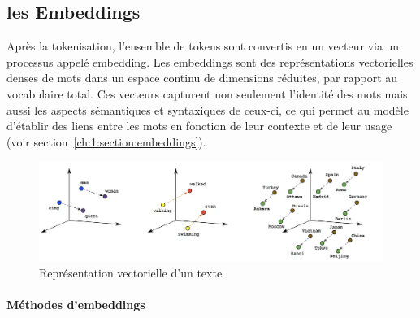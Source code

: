 \subsection{les Embeddings}
\label{ch:2:section:embeddings}

Après la tokenisation, l'ensemble de tokens sont convertis en un vecteur via un processus appelé embedding. Les embeddings sont des représentations vectorielles denses de mots dans un espace continu de dimensions réduites, par rapport au vocabulaire total. Ces vecteurs capturent non seulement l'identité des mots mais aussi les aspects sémantiques et syntaxiques de ceux-ci, ce qui permet au modèle d'établir des liens entre les mots en fonction de leur contexte et de leur usage (voir section~\ref{ch:1:section:embeddings}).

\begin{figure}[H]
    \centering
    \includegraphics[width=15cm]{gfx/fig-embeddings.png}
    \caption{Représentation vectorielle d'un texte \cite{Anala_2020}}
    \label{fig:crawler-downloading}
\end{figure}

\newpage
\paragraph{Méthodes d'embeddings} \hspace{0pt}

